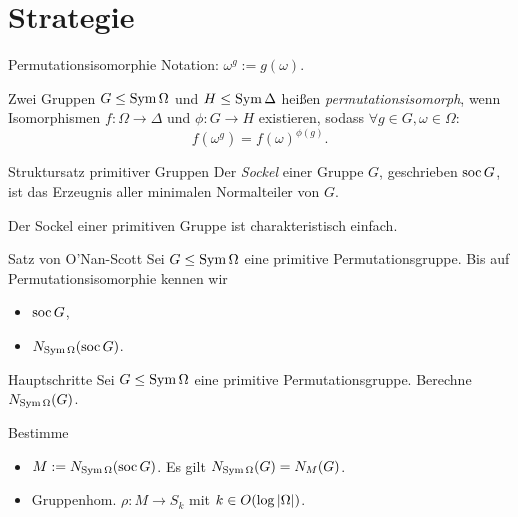 \section{Strategie}
\begin{frame}{Permutationsisomorphie}
Notation: $\omega ^ g := g(\omega)$.
\vspace{2em}

Zwei Gruppen $G \leq \operatorname{Sym} \Omega$ und $H \leq \operatorname{Sym} \Delta$ heißen
\emph{permutationsisomorph}, wenn
Isomorphismen $f : \Omega \to \Delta$ und $\phi : G \to H$ existieren,
sodass
$\forall g \in G, \omega \in \Omega$:
\[
    f( \omega ^ g ) = f(\omega) ^ {\phi(g)}.
\]
\end{frame}

\begin{frame}{Struktursatz primitiver Gruppen}
Der \emph{Sockel} einer Gruppe $G$, geschrieben
$\operatorname{soc} G$, ist das Erzeugnis aller minimalen Normalteiler von $G$.

\pause
Der Sockel einer primitiven Gruppe ist charakteristisch einfach.

\pause
\begin{block}{Satz von O'Nan-Scott}
Sei $G \leq \operatorname{Sym} \Omega$ eine primitive Permutationsgruppe.
Bis auf Permutationsisomorphie kennen wir
\begin{itemize}
\item $\operatorname{soc} G$,
\item $N_{\operatorname{Sym} \Omega}( \operatorname{soc} G )$.
\end{itemize}
\end{block}
\end{frame}

\begin{frame}{Hauptschritte}
Sei $G \leq \operatorname{Sym} \Omega$ eine primitive Permutationsgruppe.
Berechne $N_{\operatorname{Sym} \Omega}(G)$.

\pause
Bestimme
\begin{itemize}
\item $M := N_{\operatorname{Sym} \Omega}(\operatorname{soc} G)$.
Es gilt $N_{\operatorname{Sym} \Omega}(G) = N_M(G)$.

\pause
\item Gruppenhom.
$
    \rho : M \to S_k
$
mit $k \in O(\log  \left| \Omega \right| )$.
\end{itemize}
\end{frame}


